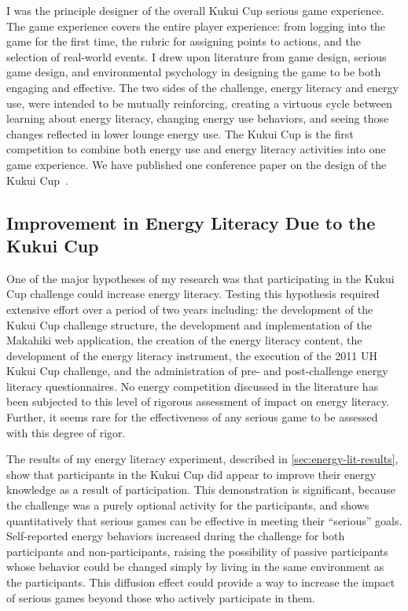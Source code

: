 I was the principle designer of the overall Kukui Cup serious game experience. The game experience covers the entire player experience: from logging into the game for the first time, the rubric for assigning points to actions, and the selection of real-world events. I drew upon literature from game design, serious game design, and environmental psychology in designing the game to be both engaging and effective. The two sides of the challenge, energy literacy and energy use, were intended to be mutually reinforcing, creating a virtuous cycle between learning about energy literacy, changing energy use behaviors, and seeing those changes reflected in lower lounge energy use. The Kukui Cup is the first competition to combine both energy use and energy literacy activities into one game experience. We have published one conference paper on the design of the Kukui Cup~\cite{csdl2-10-07}.


\subsection{Improvement in Energy Literacy Due to the Kukui Cup}

One of the major hypotheses of my research was that participating in the Kukui Cup challenge could increase energy literacy. Testing this hypothesis required extensive effort over a period of two years including: the development of the Kukui Cup challenge structure, the development and implementation of the Makahiki web application, the creation of the energy literacy content, the development of the energy literacy instrument, the execution of the 2011 UH Kukui Cup challenge, and the administration of pre- and post-challenge energy literacy questionnaires. No energy competition discussed in the literature has been subjected to this level of rigorous assessment of impact on energy literacy. Further, it seems rare for the effectiveness of any serious game to be assessed with this degree of rigor.

The results of my energy literacy experiment, described in \autoref{sec:energy-lit-results}, show that participants in the Kukui Cup did appear to improve their energy knowledge as a result of participation. This demonstration is significant, because the challenge was a purely optional activity for the participants, and shows quantitatively that serious games can be effective in meeting their ``serious'' goals. Self-reported energy behaviors increased during the challenge for both participants and non-participants, raising the possibility of passive participants whose behavior could be changed simply by living in the same environment as the participants. This diffusion effect could provide a way to increase the impact of serious games beyond those who actively participate in them.


